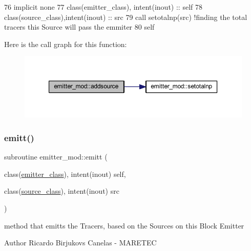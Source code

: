 \begin{DoxyCode}
76     \textcolor{keywordtype}{implicit none}
77     \textcolor{keywordtype}{class}(emitter\_class), \textcolor{keywordtype}{intent(inout)} :: self
78     \textcolor{keywordtype}{class}(source\_class),\textcolor{keywordtype}{intent(inout)} :: src
79     \textcolor{keyword}{call }setotalnp(src) \textcolor{comment}{!finding the total tracers this Source will pass the emmiter}
80     self%
\end{DoxyCode}
Here is the call graph for this function\+:\nopagebreak
\begin{figure}[H]
\begin{center}
\leavevmode
\includegraphics[width=350pt]{namespaceemitter__mod_ab704fb0e2eb9b3b4b9542706b6fb4eaf_cgraph}
\end{center}
\end{figure}
\mbox{\label{namespaceemitter__mod_aae156a463b225044bc10f039ede5770d}} 
\subsubsection{\texorpdfstring{emitt()}{emitt()}}
{\footnotesize\ttfamily subroutine emitter\+\_\+mod\+::emitt (\begin{DoxyParamCaption}\item[{class(\mbox{\hyperlink{structemitter__mod_1_1emitter__class}{emitter\+\_\+class}}), intent(inout)}]{self,  }\item[{class(\mbox{\hyperlink{structsources__mod_1_1source__class}{source\+\_\+class}}), intent(inout)}]{src }\end{DoxyParamCaption})\hspace{0.3cm}{\ttfamily [private]}}



method that emitts the Tracers, based on the Sources on this Block Emitter 

\begin{DoxyAuthor}{Author}
Ricardo Birjukovs Canelas -\/ M\+A\+R\+E\+T\+EC
\end{DoxyAuthor}

